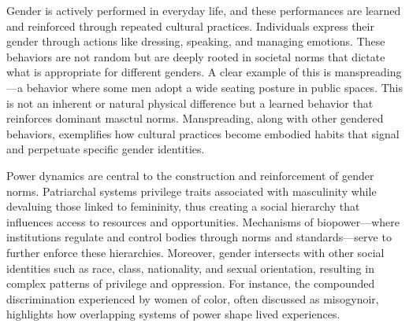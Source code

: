 \documentclass{article}
\begin{document}
Gender is actively performed in everyday life, and these performances are learned and reinforced through repeated cultural practices.
Individuals express their gender through actions like dressing, speaking, and managing emotions.
These behaviors are not random but are deeply rooted in societal norms that dictate what is appropriate for different genders.
A clear example of this is manspreading—a behavior where some men adopt a wide seating posture in public spaces.
This is not an inherent or natural physical difference but a learned behavior that reinforces dominant masctul norms.
Manspreading, along with other gendered behaviors, exemplifies how cultural practices become embodied habits that signal and perpetuate specific gender identities.

Power dynamics are central to the construction and reinforcement of gender norms.
Patriarchal systems privilege traits associated with masculinity while devaluing those linked to femininity, thus creating a social hierarchy that influences access to resources and opportunities.
Mechanisms of biopower—where institutions regulate and control bodies through norms and standards—serve to further enforce these hierarchies.
Moreover, gender intersects with other social identities such as race, class, nationality, and sexual orientation, resulting in complex patterns of privilege and oppression.
For instance, the compounded discrimination experienced by women of color, often discussed as misogynoir, highlights how overlapping systems of power shape lived experiences.
\end{document}
